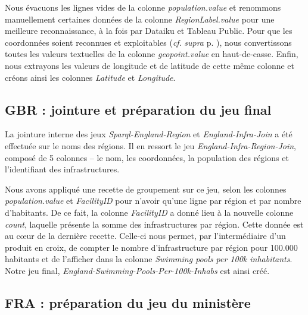 \documentclass[hidelinks, 12pt]{report}
\begin{document}
Nous évacuons les lignes vides de la colonne \textit{population.value} et renommons manuellement certaines données de la colonne \textit{RegionLabel.value} pour une meilleure reconnaissance, à la fois par Dataiku et Tableau Public. Pour que les coordonnées soient reconnues et exploitables (\textit{cf}. \textit{supra} p. \pageref{casse}), nous convertissons toutes les valeurs textuelles de la colonne \textit{geopoint.value} en haut-de-casse. Enfin, nous extrayons les valeurs de longitude et de latitude de cette même colonne et créons ainsi les colonnes \textit{Latitude} et \textit{Longitude}.





%





\subsection{GBR : jointure et préparation du jeu final}

La jointure interne des jeux \textit{Sparql-England-Region} et \textit{England-Infra-Join} a été effectuée sur le noms des régions. Il en ressort le jeu \textit{England-Infra-Region-Join}, composé de 5 colonnes -- le nom, les coordonnées, la population des régions et l'identifiant des infrastructures.

Nous avons appliqué une recette de groupement sur ce jeu, selon les colonnes \textit{population.value} et \textit{FacilityID} pour n'avoir qu'une ligne par région et par nombre d'habitants. De ce fait, la colonne \textit{FacilityID} a donné lieu à la nouvelle colonne \textit{count}, laquelle présente la somme des infrastructures par région. Cette donnée est au cœur de la dernière recette. Celle-ci nous permet, par l'intermédiaire d'un produit en croix, de compter le nombre d'infrastructure par région pour 100.000 habitants et de l'afficher dans la colonne \textit{Swimming pools per 100k inhabitants}. Notre jeu final, \textit{England-Swimming-Pools-Per-100k-Inhabs} est ainsi créé.





%





\subsection{FRA : préparation du jeu du ministère}
\end{document}
